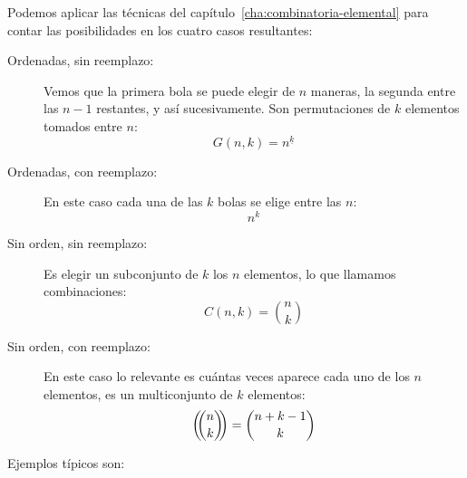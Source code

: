   Podemos aplicar
  las técnicas del capítulo~\ref{cha:combinatoria-elemental}%
  para contar las posibilidades en los cuatro casos resultantes:
  \begin{description}
  \item[Ordenadas, sin reemplazo:]
    Vemos que la primera bola se puede elegir de \(n\) maneras,
    la segunda entre las \(n - 1\) restantes,
    y así sucesivamente.
    Son permutaciones de \(k\) elementos tomados entre \(n\):
    \begin{equation*}
      G(n, k)
	= n^{\underline{k}}
    \end{equation*}
  \item[Ordenadas, con reemplazo:]
    En este caso
    cada una de las \(k\) bolas se elige entre las \(n\):
    \begin{equation*}
      n^k
    \end{equation*}
  \item[Sin orden, sin reemplazo:]
    Es elegir un subconjunto de \(k\) los \(n\) elementos,
    lo que llamamos combinaciones:
    \begin{equation*}
      C(n, k)
	= \binom{n}{k}
    \end{equation*}
  \item[Sin orden, con reemplazo:]
    En este caso lo relevante
    es cuántas veces aparece cada uno de los \(n\) elementos,
    es un multiconjunto de \(k\) elementos:
    \begin{equation*}
      \left( \!\! \binom{n}{k} \!\! \right)
	= \binom{n + k - 1}{k}
    \end{equation*}
  \end{description}
  Ejemplos típicos son:
